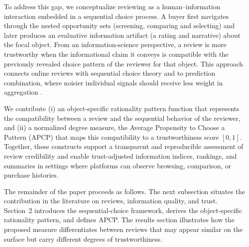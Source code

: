 \documentclass[conference]{IEEEtran}
\theoremstyle{plain}
\theoremstyle{definition}
\theoremstyle{remark}
\begin{document}
	\indent To address this gap, we conceptualize reviewing as a human--information interaction embedded in a sequential choice process. A buyer first navigates through the nested opportunity sets (screening, comparing and selecting) and later produces an evaluative information artifact (a rating and narrative) about the focal object. From an information-science perspective, a review is more trustworthy when the informational claim it conveys is compatible with the previously revealed choice pattern of the reviewer for that object. This approach connects online reviews with sequential choice theory \citep{rubinstein2006model} and to prediction combination, where noisier individual signals should receive less weight in aggregation \citep{bates1969combination,clemen1986combining,winkler1992sensitivity,winkler2004multiple,wang2023forecast}.

	\indent We contribute (i) an object-specific rationality pattern function that represents the compatibility between a review and the sequential behavior of the reviewer, and (ii) a normalized degree measure, the Average Propensity to Choose a Pattern (APCP) that maps this compatibility to a trustworthiness score $[0,1]$. Together, these constructs support a transparent and reproducible assessment of review credibility and enable trust-adjusted information indices, rankings, and summaries in settings where platforms can observe browsing, comparison, or purchase histories.

	\indent The remainder of the paper proceeds as follows. The next subsection situates the contribution in the literature on reviews, information quality, and trust. Section~2 introduces the sequential-choice framework, derives the object-specific rationality pattern, and defines APCP. The results section illustrates how the proposed measure differentiates between reviews that may appear similar on the surface but carry different degrees of trustworthiness.
\end{document}
